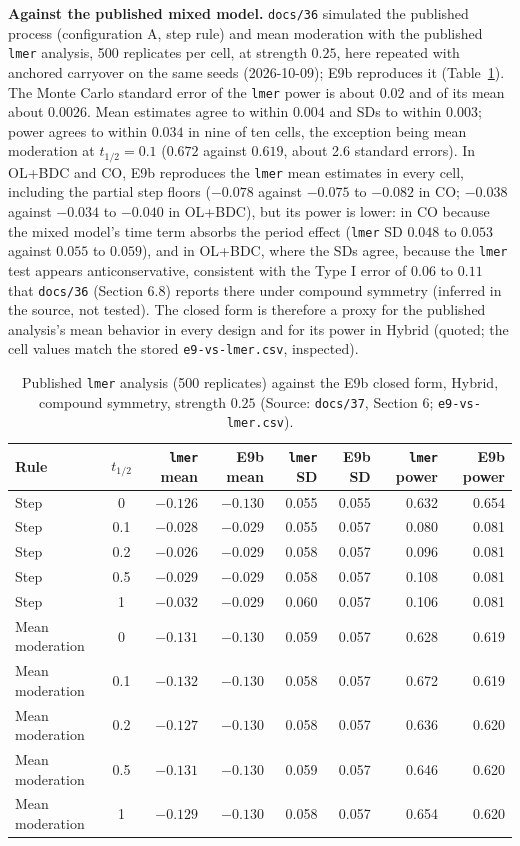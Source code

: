 \documentclass[11pt]{article}
\newcommand{\code}[1]{\texttt{#1}}
\begin{document}
\textbf{Against the published mixed model.} \code{docs/36} simulated
the published process (configuration A, step rule) and mean moderation with the
published \code{lmer} analysis, 500 replicates per cell, at strength
$0.25$, here repeated with anchored carryover on the same seeds
(2026-10-09); E9b reproduces it (Table~\ref{tab:inve-lmer}). The Monte Carlo
standard error of the \code{lmer} power is about $0.02$ and of its mean
about $0.0026$. Mean estimates agree to within $0.004$ and SDs to
within $0.003$; power agrees to within $0.034$ in nine of ten cells,
the exception being mean moderation at $t_{1/2} = 0.1$ ($0.672$ against
$0.619$, about 2.6 standard errors). In OL+BDC and CO, E9b reproduces
the \code{lmer} mean estimates in every cell, including the partial
step floors ($-0.078$ against $-0.075$ to $-0.082$ in CO; $-0.038$
against $-0.034$ to $-0.040$ in OL+BDC), but its power is lower: in CO
because the mixed model's time term absorbs the period effect
(\code{lmer} SD $0.048$ to $0.053$ against $0.055$ to $0.059$), and in
OL+BDC, where the SDs agree, because the \code{lmer} test appears
anticonservative, consistent with the Type I error of $0.06$ to $0.11$
that \code{docs/36} (Section 6.8) reports there under compound symmetry
(inferred in the source, not tested). The closed form is therefore a
proxy for the published analysis's mean behavior in every design and
for its power in Hybrid (quoted; the cell values match the stored
\code{e9-vs-lmer.csv}, inspected).

\begin{table}[h]
\centering\small
\caption{Published \code{lmer} analysis (500 replicates) against the E9b
closed form, Hybrid, compound symmetry, strength $0.25$ (Source:
\code{docs/37}, Section 6; \code{e9-vs-lmer.csv}).}
\label{tab:inve-lmer}
\begin{tabular}{@{}lcrrrrrr@{}}
\toprule
Rule & $t_{1/2}$ & \code{lmer} mean & E9b mean & \code{lmer} SD & E9b SD & \code{lmer} power & E9b power \\
\midrule
Step & 0   & $-0.126$ & $-0.130$ & 0.055 & 0.055 & 0.632 & 0.654 \\
Step & 0.1 & $-0.028$ & $-0.029$ & 0.055 & 0.057 & 0.080 & 0.081 \\
Step & 0.2 & $-0.026$ & $-0.029$ & 0.058 & 0.057 & 0.096 & 0.081 \\
Step & 0.5 & $-0.029$ & $-0.029$ & 0.058 & 0.057 & 0.108 & 0.081 \\
Step & 1   & $-0.032$ & $-0.029$ & 0.060 & 0.057 & 0.106 & 0.081 \\
Mean moderation & 0   & $-0.131$ & $-0.130$ & 0.059 & 0.057 & 0.628 & 0.619 \\
Mean moderation & 0.1 & $-0.132$ & $-0.130$ & 0.058 & 0.057 & 0.672 & 0.619 \\
Mean moderation & 0.2 & $-0.127$ & $-0.130$ & 0.058 & 0.057 & 0.636 & 0.620 \\
Mean moderation & 0.5 & $-0.131$ & $-0.130$ & 0.059 & 0.057 & 0.646 & 0.620 \\
Mean moderation & 1   & $-0.129$ & $-0.130$ & 0.058 & 0.057 & 0.654 & 0.620 \\
\bottomrule
\end{tabular}
\end{table}
\end{document}
